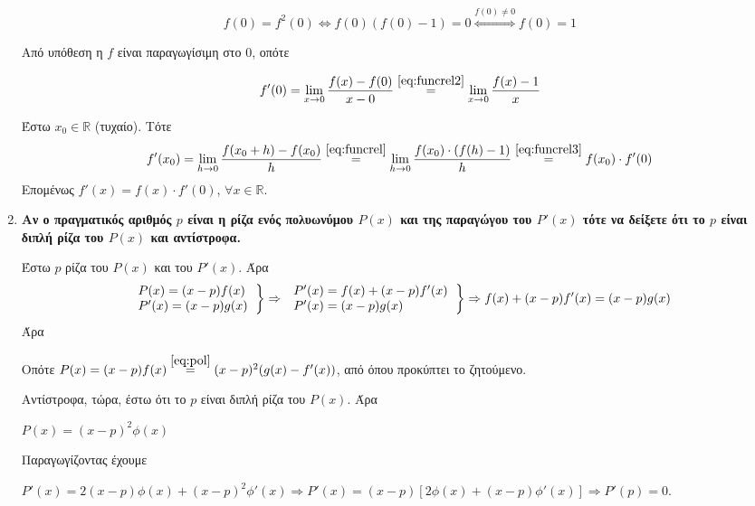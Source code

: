 \documentclass[a4paper,table]{report}
\begin{document}
\begin{enumerate}
\begin{solution}
		\begin{equation}\label{eq:funcrel2}
			f(0) = f^{2}(0) \Leftrightarrow f(0)(f(0) - 1) = 0 \overset{f(0)\neq
			0}{\Leftrightarrow} f(0) = 1	
		\end{equation}

		Από υπόθεση η $f$ είναι παραγωγίσιμη στο 0, οπότε

		\begin{equation}\label{eq:funcrel3}
			f'(0) = \lim_{x\to 0} \frac{f(x) - f(0)}{x - 0}
			\overset{\eqref{eq:funcrel2}}{=} \lim_{x\to 0}
			\frac{f(x) - 1}{x} 	
		\end{equation}

		Έστω $ x_{0} \in \mathbb{R} $ (τυχαίο). Τότε
		\[
			f'(x_{0}) = \lim_{h\to 0} \frac{f(x_{0} + h) -
			f(x_{0})}{h}	\overset{\eqref{eq:funcrel}}{=} \lim_{h\to 0} \frac{f(x_{0})\cdot
		(f(h) - 1)}{h} \overset{\eqref{eq:funcrel3}}{=} f(x_{0})\cdot f'(0)
		\]
		Επομένως $ f'(x) = f(x)\cdot f'(0)$, $ \forall x \in \mathbb{R} $.
  \end{solution}

	\item {\bfseries \boldmath Αν ο πραγματικός αριθμός $p$ είναι η ρίζα ενός πολυωνύμου 
      $ P(x) $ και της παραγώγου του $ P'(x) $ τότε να δείξετε ότι το $p$ είναι διπλή
	ρίζα του $ P(x) $ και αντίστροφα.}
  \begin{solution}
		Έστω $p$ ρίζα του $ P(x) $ και του $ P'(x) $. Άρα
		\[
			\left.
				\begin{tabular}{l}
			$P(x) = (x-p)f(x)$ \\
			$P'(x) = (x-p)g(x)$
				\end{tabular}
			\right\}\Rightarrow 
			\left.
				\begin{tabular}{l}
			$P'(x) = f(x) + (x-p)f'(x)$ \\
			$P'(x) = (x-p)g(x)$
				\end{tabular}
			\right\}\Rightarrow
			f(x) + (x-p)f'(x) = (x-p)g(x) 
			\]
			Άρα  

			Οπότε $ P(x) = (x-p)f(x) \overset{\eqref{eq:pol}}{=} (x-p)^{2}(g(x)
			- f'(x)) $, από όπου προκύπτει το ζητούμενο.

			Αντίστροφα, τώρα, έστω ότι το $p$ είναι διπλή ρίζα του $ P(x) $. Άρα 

			$ P(x) = (x-p)^{2}\phi(x) $

			Παραγωγίζοντας έχουμε

			$ P'(x) = 2(x-p)\phi(x) + (x-p)^{2}\phi'(x) \Rightarrow P'(x) =
			(x-p)[2\phi(x) + (x-p)\phi'(x)] \Rightarrow P'(p) = 0 $.
  \end{solution}


\end{enumerate}
\end{document}
